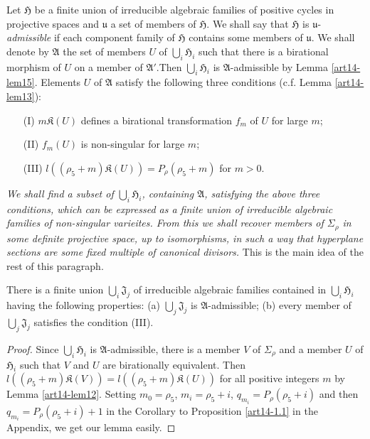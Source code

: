Let $\mathfrak{H}$ be a finite union of irreducible algebraic families of positive cycles in projective spaces and $\mathfrak{u}$ a set of members of $\mathfrak{H}$. We shall say that $\mathfrak{H}$ is $\mathfrak{u}$-{\em admissible} if each component family of $\mathfrak{H}$ contains some members of $\mathfrak{u}$. We shall denote by $\mathfrak{A}$ the set of members $U$ of $\bigcup_{i}\mathfrak{H}_{i}$ such that there is a birational morphism of $U$ on a member of $\mathfrak{A}'$.\pageoriginale Then $\bigcup_{i}\mathfrak{H}_{i}$ is $\mathfrak{A}$-admissible by Lemma \ref{art14-lem15}. Elements $U$ of $\mathfrak{A}$ satisfy the following three conditions (c.f. Lemma \ref{art14-lem13}):
\begin{itemize}
\item[(I)] $m\mathfrak{K}(U)$ defines a birational transformation $f_{m}$ of $U$ for large $m$; 

\item[(II)] $f_{m}(U)$ is non-singular for large $m$;

\item[(III)] $l((\rho_{5}+m)\mathfrak{K}(U))=P_{\rho}(\rho_{5}+m)$ for $m>0$.
\end{itemize}
{\em We shall find a subset of $\bigcup_{i}\mathfrak{H}_{i}$, containing $\mathfrak{A}$, satisfying the above three conditions, which can be expressed as a finite union of irreducible algebraic families of non-singular varieites. From this we shall recover members of $\Sigma_{\rho}$ in some definite projective space, up to isomorphisms, in such a way that hyperplane sections are some fixed multiple of canonical divisors.} This is the main idea of the rest of this paragraph.

\begin{lemma}\label{art14-lem16}
There is a finite union $\bigcup_{i}\mathfrak{J}_{j}$ of irreducible algebraic families contained in $\bigcup_{i}\mathfrak{H}_{i}$ having the following properties: {\rm(a)} $\bigcup_{j}\mathfrak{J}_{j}$ is $\mathfrak{A}$-admissible; {\rm(b)} every member of $\bigcup_{j}\mathfrak{J}_{j}$ satisfies the condition {\rm(III)}.
\end{lemma}

\begin{proof}
Since $\bigcup_{i}\mathfrak{H}_{i}$ is $\mathfrak{A}$-admissible, there is a member $V$ of $\Sigma_{\rho}$ and a member $U$ of $\mathfrak{H}_{i}$ such that $V$ and $U$ are birationally equivalent. Then $l((\rho_{5}+m)\mathfrak{K}(V))=l((\rho_{5}+m)\mathfrak{K}(U))$ for all positive integers $m$ by Lemma \ref{art14-lem12}. Setting $m_{0}=\rho_{5}$, $m_{i}=\rho_{5}+i$, $q_{m_{i}}=P_{\rho}(\rho_{5}+i)$ and then $q_{m_{i}}=P_{\rho}(\rho_{5}+i)+1$ in the Corollary to Proposition \ref{art14-1.1} in the Appendix, we get our lemma easily.
\end{proof}

